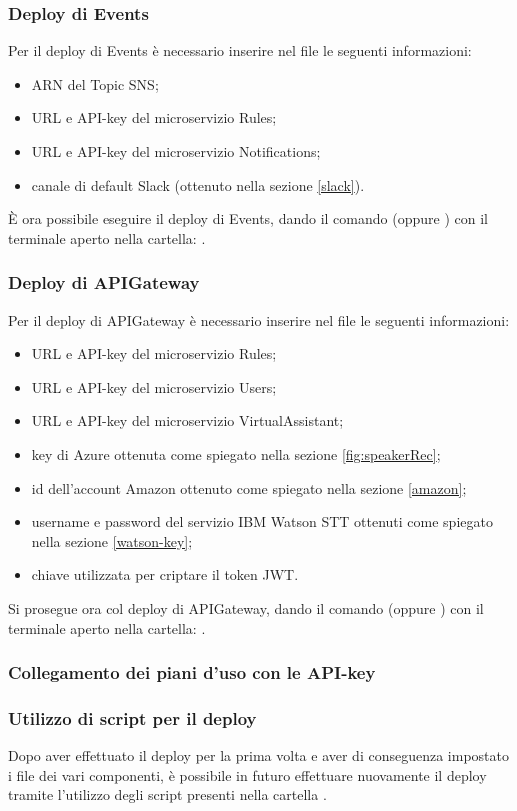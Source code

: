 \subsubsection{Deploy di Events}\label{deploy-events}
Per il deploy di Events è necessario inserire nel file  le seguenti informazioni:
\begin{itemize}
	\item ARN del Topic SNS;
	\item URL e API-key del microservizio Rules;
	\item URL e API-key del microservizio Notifications;
	\item canale di default Slack (ottenuto nella sezione \ref{slack}).
\end{itemize}
È ora possibile eseguire il deploy di Events, dando il comando  (oppure ) con il terminale aperto nella cartella: .


\subsubsection{Deploy di APIGateway}
Per il deploy di APIGateway è necessario inserire nel file  le seguenti informazioni:
\begin{itemize}
	\item URL e API-key del microservizio Rules;
	\item URL e API-key del microservizio Users;
	\item URL e API-key del microservizio VirtualAssistant;
	\item key di Azure ottenuta come spiegato nella sezione \ref{fig:speakerRec};
	\item id dell'account Amazon ottenuto come spiegato nella sezione \ref{amazon};
	\item username e password del servizio IBM Watson STT ottenuti come spiegato nella sezione \ref{watson-key};
	\item chiave utilizzata per criptare il token JWT.
\end{itemize}
Si prosegue ora col deploy di APIGateway, dando il comando  (oppure ) con il terminale aperto nella cartella: .

\subsubsection{Collegamento dei piani d'uso con le API-key}


\subsubsection{Utilizzo di script per il deploy}
Dopo aver effettuato il deploy per la prima volta e aver di conseguenza impostato i file  dei vari componenti, è possibile in futuro effettuare nuovamente il deploy tramite l'utilizzo degli script presenti nella cartella .


\newpage

